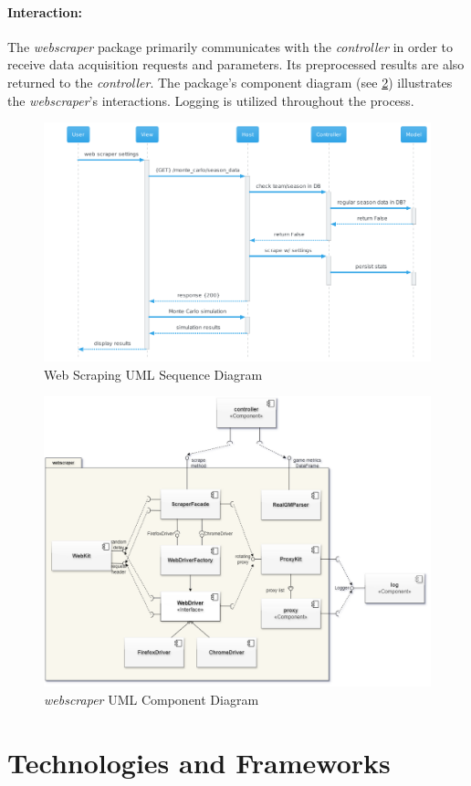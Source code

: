 \documentclass{thesis-ekf}
\theoremstyle{definition}
\theoremstyle{remark}
\begin{document}
{\paragraph{Interaction:}
The \emph{webscraper} package primarily communicates with the \emph{controller} in order to receive data acquisition requests and parameters. Its preprocessed results are also returned to the \emph{controller}. The package's component diagram (see \ref{img-webscraper-component}) illustrates the \emph{webscraper}'s interactions. Logging is utilized throughout the process.
\begin{figure}[th!]
	\centering
	\includegraphics[width=0.9\linewidth]{img/sequence/scraping/scraping_caerilian}
	\caption{Web Scraping UML Sequence Diagram}
	\label{img-scraping-sequence}
\end{figure}
\begin{figure}[th!]
	\centering
	\includegraphics[width=0.7\linewidth]{img/component/component_webscraper}
	\caption{\emph{webscraper} UML Component Diagram}
	\label{img-webscraper-component}
\end{figure}


\section{Technologies and Frameworks}

}
\end{document}
